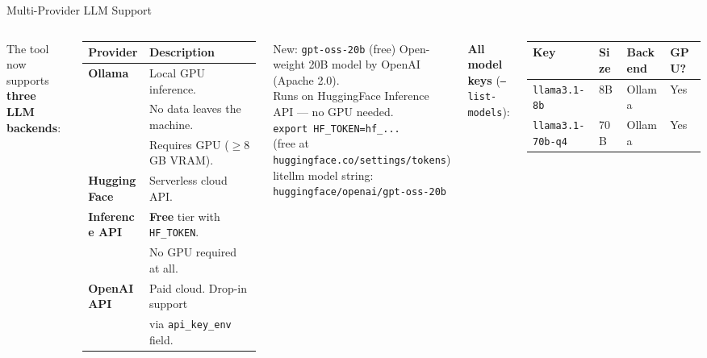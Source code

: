 \documentclass[aspectratio=169,10pt]{beamer}
\newcommand{\hl}[1]{\textcolor{mlirblue}{\textbf{#1}}}
\newcommand{\hlc}[1]{\textcolor{ragcyan}{\textbf{#1}}}
\newcommand{\hlq}[1]{\textcolor{quakegold}{\textbf{#1}}}
\begin{document}
\begin{frame}{Multi-Provider LLM Support}
  \begin{columns}[T]
      The tool now supports \textbf{three LLM backends}:
      \vspace{4pt}
      \begin{tabular}{@{}lp{3.5cm}@{}}
        \toprule
        Provider & Description \\
        \midrule
        \hlq{Ollama} & Local GPU inference.\\
                     & No data leaves the machine.\\
                     & Requires GPU ($\ge$8 GB VRAM). \\[4pt]
        \hlc{HuggingFace} & Serverless cloud API.\\
        \hlc{Inference API} & \textbf{Free} tier with \texttt{HF\_TOKEN}.\\
                             & No GPU required at all. \\[4pt]
        \hl{OpenAI API} & Paid cloud. Drop-in support\\
                        & via \texttt{api\_key\_env} field. \\
        \bottomrule
      \end{tabular}
      \vspace{6pt}
      \begin{exampleblock}{New: \texttt{gpt-oss-20b} (free)}
        \scriptsize
        Open-weight 20B model by OpenAI (Apache 2.0).\\
        Runs on HuggingFace Inference API --- no GPU needed.\\[2pt]
        \texttt{export HF\_TOKEN=hf\_...}\\
        \quad (free at \texttt{huggingface.co/settings/tokens})\\[2pt]
        litellm model string:\\
        \texttt{huggingface/openai/gpt-oss-20b}
      \end{exampleblock}
      \textbf{All model keys} (\texttt{--list-models}):
      \vspace{4pt}
      \begin{tabular}{@{}llll@{}}
        \toprule
        Key & Size & Backend & GPU? \\
        \midrule
        \texttt{llama3.1-8b} & 8B & Ollama & Yes \\
        \texttt{llama3.1-70b-q4} & 70B & Ollama & Yes \\

\end{tabular}
\end{columns}
\end{frame}
\end{document}
